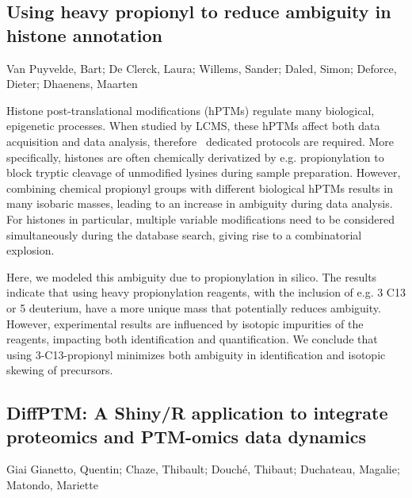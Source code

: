{\subsection*{\color{eubicRed} Using heavy propionyl to reduce ambiguity in histone annotation}
{\color{eubicGray}Van Puyvelde, Bart;
De Clerck, Laura;
Willems, Sander;
Daled, Simon;
Deforce, Dieter;
Dhaenens, Maarten}

Histone post-translational modifications (hPTMs) regulate many biological, epigenetic processes. When studied by LCMS, these hPTMs affect both data acquisition and data analysis, therefore  dedicated protocols are required. More specifically, histones are often chemically derivatized by e.g. propionylation to block tryptic cleavage of unmodified lysines during sample preparation. However, combining chemical propionyl groups with different biological hPTMs results in many isobaric masses, leading to an increase in ambiguity during data analysis. For histones in particular, multiple variable modifications need to be considered simultaneously during the database search, giving rise to a combinatorial explosion.

Here, we modeled this ambiguity due to propionylation in silico. The results indicate that using heavy propionylation reagents, with the inclusion of e.g. 3 C13 or 5 deuterium, have a more unique mass that potentially reduces ambiguity. However, experimental results are influenced by isotopic impurities of the reagents, impacting both identification and quantification. We conclude that using 3-C13-propionyl minimizes both ambiguity in identification and isotopic skewing of precursors.


\subsection*{\color{eubicRed} DiffPTM: A Shiny/R application to integrate proteomics and PTM-omics data dynamics}
{\color{eubicGray}Giai Gianetto, Quentin;
Chaze, Thibault;
Douché, Thibaut;
Duchateau, Magalie;
Matondo, Mariette}

}
